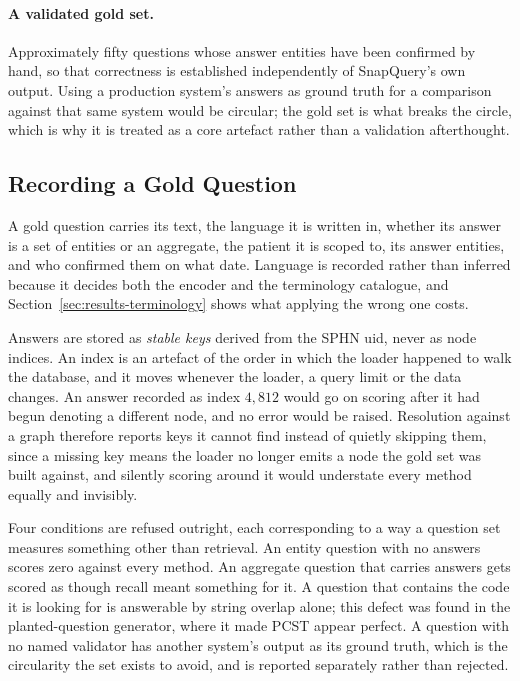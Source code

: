 \paragraph{A validated gold set.} Approximately fifty questions whose answer
entities have been confirmed by hand, so that correctness is established
independently of SnapQuery's own output. Using a production system's answers as
ground truth for a comparison against that same system would be circular; the
gold set is what breaks the circle, which is why it is treated as a core artefact
rather than a validation afterthought.

\subsection{Recording a Gold Question} \label{sec:methodology-goldset}

A gold question carries its text, the language it is written in, whether its
answer is a set of entities or an aggregate, the patient it is scoped to, its
answer entities, and who confirmed them on what date. Language is recorded
rather than inferred because it decides both the encoder and the terminology
catalogue, and Section~\ref{sec:results-terminology} shows what applying the
wrong one costs.

Answers are stored as \emph{stable keys} derived from the SPHN uid, never as
node indices. An index is an artefact of the order in which the loader happened
to walk the database, and it moves whenever the loader, a query limit or the
data changes. An answer recorded as index $4{,}812$ would go on scoring after it
had begun denoting a different node, and no error would be raised. Resolution
against a graph therefore reports keys it cannot find instead of quietly
skipping them, since a missing key means the loader no longer emits a node the
gold set was built against, and silently scoring around it would understate
every method equally and invisibly.

Four conditions are refused outright, each corresponding to a way a question set
measures something other than retrieval. An entity question with no answers
scores zero against every method. An aggregate question that carries answers
gets scored as though recall meant something for it. A question that contains
the code it is looking for is answerable by string overlap alone; this defect
was found in the planted-question generator, where it made PCST appear perfect.
A question with no named validator has another system's output as its ground
truth, which is the circularity the set exists to avoid, and is reported
separately rather than rejected.

